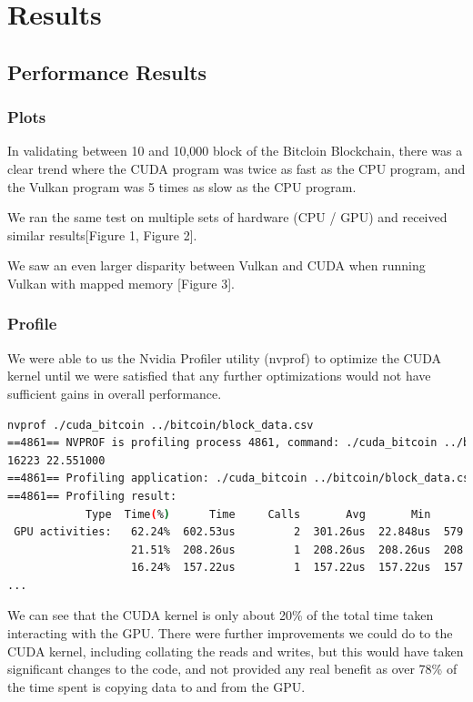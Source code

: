 \documentclass{article}
\begin{document}
\section {Results}

\subsection {Performance Results}

\subsubsection {Plots}

In validating between 10 and 10,000 block of the Bitcloin Blockchain, there was a clear trend where the CUDA program was twice as fast as the CPU program, and the Vulkan program was 5 times as slow as the CPU program.

We ran the same test on multiple sets of hardware (CPU / GPU) and received similar results[Figure 1, Figure 2].

We saw an even larger disparity between Vulkan and CUDA when running Vulkan with mapped memory [Figure 3].



\subsubsection {Profile}

We were able to us the Nvidia Profiler utility (nvprof) to optimize the CUDA kernel until we were satisfied that any further optimizations would not have sufficient gains in overall performance.

\begin{lstlisting}[language=Bash]
nvprof ./cuda_bitcoin ../bitcoin/block_data.csv 
==4861== NVPROF is profiling process 4861, command: ./cuda_bitcoin ../bitcoin/block_data.csv
16223 22.551000
==4861== Profiling application: ./cuda_bitcoin ../bitcoin/block_data.csv
==4861== Profiling result:
            Type  Time(%)      Time     Calls       Avg       Min       Max  Name
 GPU activities:   62.24%  602.53us         2  301.26us  22.848us  579.68us  [CUDA memcpy HtoD]
                   21.51%  208.26us         1  208.26us  208.26us  208.26us  kernel(unsigned char*, int*, int, unsigned char*)
                   16.24%  157.22us         1  157.22us  157.22us  157.22us  [CUDA memcpy DtoH]
...
\end{lstlisting}

We can see that the CUDA kernel is only about 20\% of the total time taken interacting with the GPU. There were further improvements we could do to the CUDA kernel, including collating the reads and writes, but this would have taken significant changes to the code, and not provided any real benefit as over 78\% of the time spent is copying data to and from the GPU.
\end{document}
